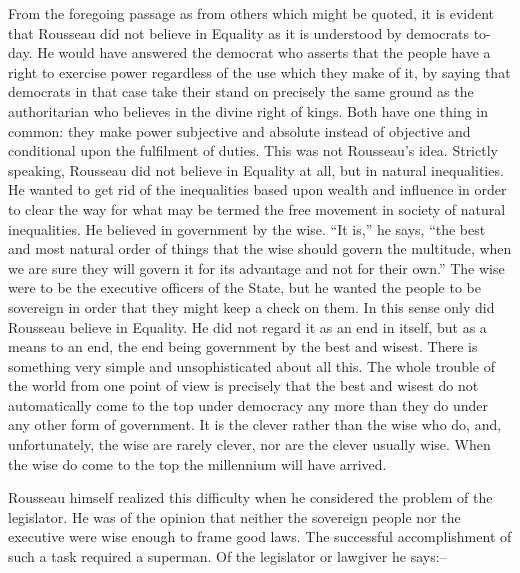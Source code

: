 \documentclass{book}
\begin{document}
From the foregoing passage as from others which might be quoted, it is evident that Rousseau did not believe in Equality as it is understood by democrats to-day. He would have answered the democrat who asserts that the people have a right to exercise power regardless of the use which they make of it, by saying that democrats in that case take their stand on precisely the same ground as the authoritarian who believes in the divine right of kings. Both have one thing in common: they make power subjective and absolute instead of objective and conditional upon the fulfilment of duties. This was not Rousseau’s idea. Strictly speaking, Rousseau did not believe in Equality at all, but in natural inequalities. He wanted to get rid of the inequalities based upon wealth and influence in order to clear the way for what may be termed the free movement in society of natural inequalities. He believed in government by the wise. “It is,” he says, “the best and most natural order of things that the wise should govern the multitude, when we are sure they will govern it for its advantage and not for their own.” The wise were to be the executive officers of the State, but he wanted the people to be sovereign in order that they might keep a check on them. In this sense only did Rousseau believe in Equality. He did not regard it as an end in itself, but as a means to an end, the end being government by the best and wisest. There is something very simple and unsophisticated about all this. The whole trouble of the world from one point of view is precisely that the best and wisest do not automatically come to the top under democracy any more than they do under any other form of government. It is the clever rather than the wise who do, and, unfortunately, the wise are rarely clever, nor are the clever usually wise. When the wise do come to the top the millennium will have arrived.

Rousseau himself realized this difficulty when he considered the problem of the legislator. He was of the opinion that neither the sovereign people nor the executive were wise enough to frame good laws. The successful accomplishment of such a task required a superman. Of the legislator or lawgiver he says:–
\end{document}
